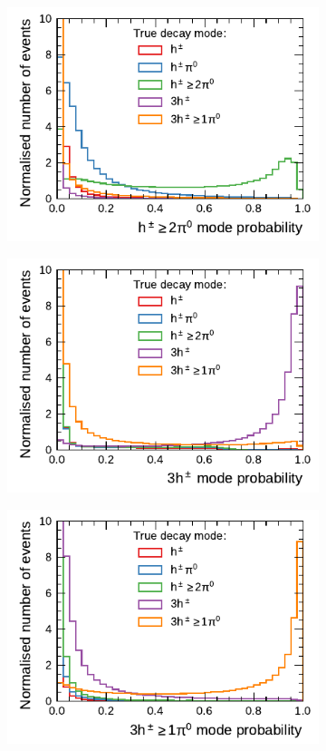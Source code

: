 \begin{figure}[!ht]
\begin{subfigure}{0.48\textwidth}
  \end{subfigure}
  \begin{subfigure}{0.48\textwidth}
    \centering
    \includegraphics{./figures/decay_mode_classification/combined_proba/proba_1pXn.pdf}
  \end{subfigure}\hfill
  \begin{subfigure}{0.48\textwidth}
    \centering
    \includegraphics{./figures/decay_mode_classification/combined_proba/proba_3p0n.pdf}
  \end{subfigure}
  \begin{subfigure}{0.48\textwidth}
    \centering
    \includegraphics{./figures/decay_mode_classification/combined_proba/proba_3pXn.pdf}

\end{subfigure}
\end{figure}

